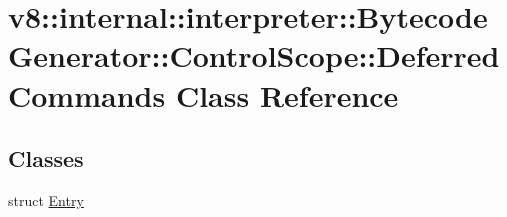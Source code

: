 \hypertarget{classv8_1_1internal_1_1interpreter_1_1BytecodeGenerator_1_1ControlScope_1_1DeferredCommands}{}\section{v8\+:\+:internal\+:\+:interpreter\+:\+:Bytecode\+Generator\+:\+:Control\+Scope\+:\+:Deferred\+Commands Class Reference}
\label{classv8_1_1internal_1_1interpreter_1_1BytecodeGenerator_1_1ControlScope_1_1DeferredCommands}
\subsection*{Classes}
\begin{DoxyCompactItemize}
\item 
struct \mbox{\hyperlink{structv8_1_1internal_1_1interpreter_1_1BytecodeGenerator_1_1ControlScope_1_1DeferredCommands_1_1Entry}{Entry}}
\end{DoxyCompactItemize}
